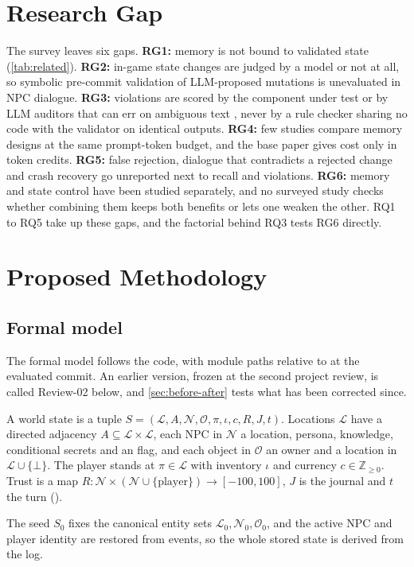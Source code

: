 \documentclass[letterpaper,journal]{IEEEtran}
\begin{document}
\section{Research Gap}\label{sec:gap}

The survey leaves six gaps. \textbf{RG1:} memory is not bound to validated state (\cref{tab:related}). \textbf{RG2:} in-game state changes are judged by a model \cite{buongiorno2024pangea,phillips2025goal} or not at all, so symbolic pre-commit validation of LLM-proposed mutations is unevaluated in NPC dialogue. \textbf{RG3:} violations are scored by the component under test or by LLM auditors that can err on ambiguous text \cite{ma2026ncp}, never by a rule checker sharing no code with the validator on identical outputs. \textbf{RG4:} few studies compare memory designs at the same prompt-token budget, and the base paper gives cost only in token credits. \textbf{RG5:} false rejection, dialogue that contradicts a rejected change and crash recovery go unreported next to recall and violations. \textbf{RG6:} memory and state control have been studied separately, and no surveyed study checks whether combining them keeps both benefits or lets one weaken the other. RQ1 to RQ5 take up these gaps, and the factorial behind RQ3 tests RG6 directly.

\section{Proposed Methodology}\label{sec:method}

\subsection{Formal model}\label{sec:formal}
The formal model follows the code, with module paths relative to  at the evaluated commit. An earlier version, frozen at the second project review, is called Review-02 below, and \cref{sec:before-after} tests what has been corrected since.

\begin{definition}\label{def:state}
A world state is a tuple $S=(\mathcal{L},A,\mathcal{N},\mathcal{O},\pi,\iota,c,R,J,t)$. Locations $\mathcal{L}$ have a directed adjacency $A\subseteq\mathcal{L}\times\mathcal{L}$, each NPC in $\mathcal{N}$ a location, persona, knowledge, conditional secrets and an  flag, and each object in $\mathcal{O}$ an owner and a location in $\mathcal{L}\cup\{\bot\}$. The player stands at $\pi\in\mathcal{L}$ with inventory $\iota$ and currency $c\in\mathbb{Z}_{\ge 0}$. Trust is a map $R:\mathcal{N}\times(\mathcal{N}\cup\{\text{player}\})\to[-100,100]$, $J$ is the journal and $t$ the turn ().
\end{definition}
The seed $S_0$ fixes the canonical entity sets $\mathcal{L}_0,\mathcal{N}_0,\mathcal{O}_0$, and the active NPC and player identity are restored from events, so the whole stored state is derived from the log.
\end{document}
